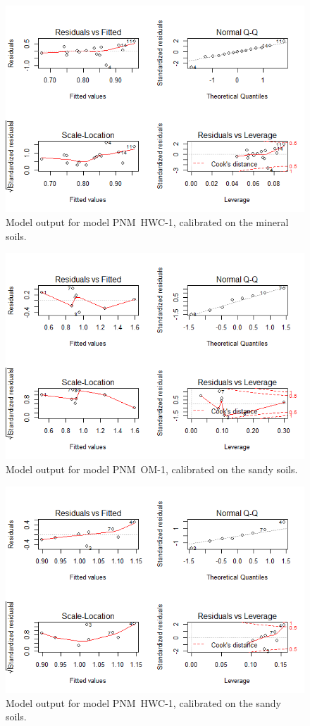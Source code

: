 \documentclass[10pt,twoside,dutch,english]{report}
\begin{document}
\begin{appendices}
\begin{figure}[H]
    	\centering
		\includegraphics[width=0.85\linewidth]{appendix_modout_min_hw}
		\caption{Model output for model  PNM~HWC-1, calibrated on the mineral soils.}
		\end{figure}
		\begin{figure}[H] %
    	\centering
		\includegraphics[width=0.85\linewidth]{appendix_modout_sand_om}
		\caption{Model output for model  PNM~OM-1, calibrated on the sandy soils.}
		\end{figure}
		\begin{figure}[H] %
    	\centering
		\includegraphics[width=0.85\linewidth]{appendix_modout_sand_hw}
		\caption{Model output for model  PNM~HWC-1, calibrated on the sandy soils.}
		\end{figure}
	


\end{appendices}
\end{document}
